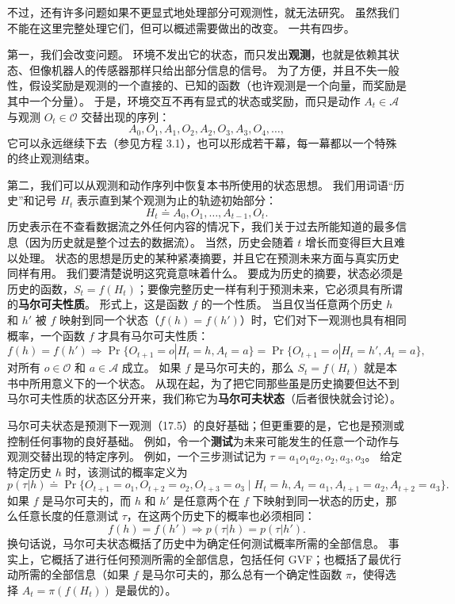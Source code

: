 \documentclass[UTF8,12pt,a4paper,fontset=fandol]{ctexart}
\begin{document}
不过，还有许多问题如果不更显式地处理部分可观测性，就无法研究。
虽然我们不能在这里完整处理它们，但可以概述需要做出的改变。
一共有四步。

第一，我们会改变问题。
环境不发出它的状态，而只发出\textbf{观测}，也就是依赖其状态、但像机器人的传感器那样只给出部分信息的信号。
为了方便，并且不失一般性，假设奖励是观测的一个直接的、已知的函数（也许观测是一个向量，而奖励是其中一个分量）。
于是，环境交互不再有显式的状态或奖励，而只是动作 $A_t\in\mathcal{A}$ 与观测 $O_t\in\mathcal{O}$ 交替出现的序列：
\[
A_0,O_1,A_1,O_2,A_2,O_3,A_3,O_4,\ldots,
\]
它可以永远继续下去（参见方程 3.1），也可以形成若干幕，每一幕都以一个特殊的终止观测结束。

第二，我们可以从观测和动作序列中恢复本书所使用的状态思想。
我们用词语“历史”和记号 $H_t$ 表示直到某个观测为止的轨迹初始部分：
\[
H_t\doteq A_0,O_1,\ldots,A_{t-1},O_t.
\]
历史表示在不查看数据流之外任何内容的情况下，我们关于过去所能知道的最多信息（因为历史就是整个过去的数据流）。
当然，历史会随着 $t$ 增长而变得巨大且难以处理。
状态的思想是历史的某种紧凑摘要，并且它在预测未来方面与真实历史同样有用。
我们要清楚说明这究竟意味着什么。
要成为历史的摘要，状态必须是历史的函数，$S_t=f(H_t)$；要像完整历史一样有利于预测未来，它必须具有所谓的\textbf{马尔可夫性质}。
形式上，这是函数 $f$ 的一个性质。
当且仅当任意两个历史 $h$ 和 $h'$ 被 $f$ 映射到同一个状态（$f(h)=f(h')$）时，它们对下一观测也具有相同概率，一个函数 $f$ 才具有马尔可夫性质：
\begin{equation}
f(h)=f(h')\Rightarrow
\Pr\{O_{t+1}=o|H_t=h,A_t=a\}
=
\Pr\{O_{t+1}=o|H_t=h',A_t=a\},
\tag{17.5}
\end{equation}
对所有 $o\in\mathcal{O}$ 和 $a\in\mathcal{A}$ 成立。
如果 $f$ 是马尔可夫的，那么 $S_t=f(H_t)$ 就是本书中所用意义下的一个状态。
从现在起，为了把它同那些虽是历史摘要但达不到马尔可夫性质的状态区分开来，我们称它为\textbf{马尔可夫状态}（后者很快就会讨论）。

马尔可夫状态是预测下一观测（17.5）的良好基础；但更重要的是，它也是预测或控制任何事物的良好基础。
例如，令一个\textbf{测试}为未来可能发生的任意一个动作与观测交替出现的特定序列。
例如，一个三步测试记为 $\tau=a_1o_1a_2,o_2,a_3,o_3$。
给定特定历史 $h$ 时，该测试的概率定义为
\begin{equation}
p(\tau|h)\doteq
\Pr\{O_{t+1}=o_1,O_{t+2}=o_2,O_{t+3}=o_3
\mid H_t=h,A_t=a_1,A_{t+1}=a_2,A_{t+2}=a_3\}.
\tag{17.6}
\end{equation}
如果 $f$ 是马尔可夫的，而 $h$ 和 $h'$ 是任意两个在 $f$ 下映射到同一状态的历史，那么任意长度的任意测试 $\tau$，在这两个历史下的概率也必须相同：
\begin{equation}
f(h)=f(h')\Rightarrow p(\tau|h)=p(\tau|h').
\tag{17.7}
\end{equation}
换句话说，马尔可夫状态概括了历史中为确定任何测试概率所需的全部信息。
事实上，它概括了进行任何预测所需的全部信息，包括任何 GVF；也概括了最优行动所需的全部信息（如果 $f$ 是马尔可夫的，那么总有一个确定性函数 $\pi$，使得选择 $A_t=\pi(f(H_t))$ 是最优的）。
\end{document}
